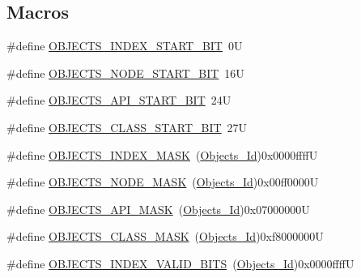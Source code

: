 \subsection*{Macros}
\begin{DoxyCompactItemize}
\item 
\#define \mbox{\hyperlink{group__RTEMSScoreObject_ga7cc4de103f4de9f42b4a89eb505ad1f5}{O\+B\+J\+E\+C\+T\+S\+\_\+\+I\+N\+D\+E\+X\+\_\+\+S\+T\+A\+R\+T\+\_\+\+B\+IT}}~0U
\item 
\#define \mbox{\hyperlink{group__RTEMSScoreObject_ga3a254f99c5f72f2f94243a852365a798}{O\+B\+J\+E\+C\+T\+S\+\_\+\+N\+O\+D\+E\+\_\+\+S\+T\+A\+R\+T\+\_\+\+B\+IT}}~16U
\item 
\#define \mbox{\hyperlink{group__RTEMSScoreObject_ga89016b0e4f07ca038969994019aed978}{O\+B\+J\+E\+C\+T\+S\+\_\+\+A\+P\+I\+\_\+\+S\+T\+A\+R\+T\+\_\+\+B\+IT}}~24U
\item 
\#define \mbox{\hyperlink{group__RTEMSScoreObject_gaa72bdfbb27b9279dbac4fe680e9d6f98}{O\+B\+J\+E\+C\+T\+S\+\_\+\+C\+L\+A\+S\+S\+\_\+\+S\+T\+A\+R\+T\+\_\+\+B\+IT}}~27U
\item 
\#define \mbox{\hyperlink{group__RTEMSScoreObject_gaadc4d76b75d97c07e1f16290a3c68f55}{O\+B\+J\+E\+C\+T\+S\+\_\+\+I\+N\+D\+E\+X\+\_\+\+M\+A\+SK}}~(\mbox{\hyperlink{group__RTEMSScoreObject_ga5821f52a51072941bdd603e542d0863e}{Objects\+\_\+\+Id}})0x0000ffffU
\item 
\#define \mbox{\hyperlink{group__RTEMSScoreObject_gaffe377d24973dea94eb29a2c4e8dc47d}{O\+B\+J\+E\+C\+T\+S\+\_\+\+N\+O\+D\+E\+\_\+\+M\+A\+SK}}~(\mbox{\hyperlink{group__RTEMSScoreObject_ga5821f52a51072941bdd603e542d0863e}{Objects\+\_\+\+Id}})0x00ff0000U
\item 
\#define \mbox{\hyperlink{group__RTEMSScoreObject_gaf5e445d4968ba98eb7251e1ed35ad999}{O\+B\+J\+E\+C\+T\+S\+\_\+\+A\+P\+I\+\_\+\+M\+A\+SK}}~(\mbox{\hyperlink{group__RTEMSScoreObject_ga5821f52a51072941bdd603e542d0863e}{Objects\+\_\+\+Id}})0x07000000U
\item 
\#define \mbox{\hyperlink{group__RTEMSScoreObject_ga9d0033a6619edcd65e622c97e53c9bc7}{O\+B\+J\+E\+C\+T\+S\+\_\+\+C\+L\+A\+S\+S\+\_\+\+M\+A\+SK}}~(\mbox{\hyperlink{group__RTEMSScoreObject_ga5821f52a51072941bdd603e542d0863e}{Objects\+\_\+\+Id}})0xf8000000U
\item 
\#define \mbox{\hyperlink{group__RTEMSScoreObject_ga9c66cd897ef03bfe06abdf0c3b6d4f36}{O\+B\+J\+E\+C\+T\+S\+\_\+\+I\+N\+D\+E\+X\+\_\+\+V\+A\+L\+I\+D\+\_\+\+B\+I\+TS}}~(\mbox{\hyperlink{group__RTEMSScoreObject_ga5821f52a51072941bdd603e542d0863e}{Objects\+\_\+\+Id}})0x0000ffffU

\end{DoxyCompactItemize}
